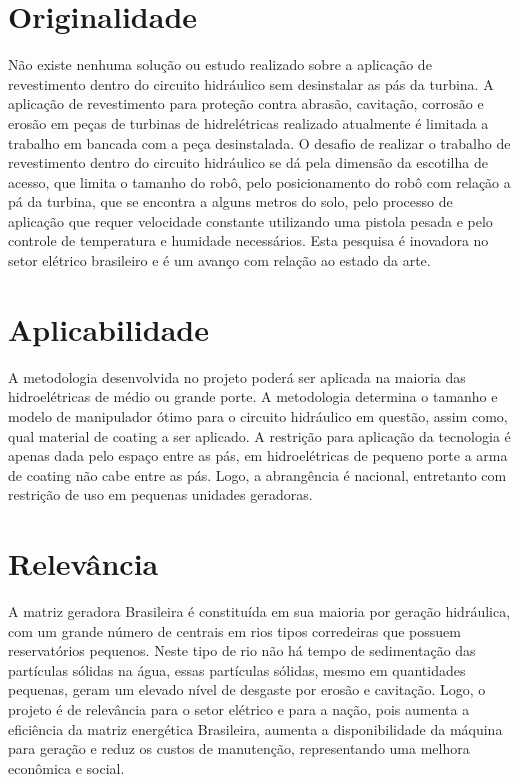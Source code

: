 \section{Originalidade}

Não existe nenhuma solução ou estudo realizado sobre a aplicação de revestimento
dentro do circuito hidráulico sem desinstalar as pás da turbina. A aplicação de
revestimento para proteção contra abrasão, cavitação, corrosão e erosão em peças
de turbinas de hidrelétricas realizado atualmente é limitada a trabalho em
bancada com a peça desinstalada. O desafio de realizar o trabalho de
revestimento dentro do circuito hidráulico se dá pela dimensão da escotilha de
acesso, que limita o tamanho do robô, pelo posicionamento do robô com relação a
pá da turbina, que se encontra a alguns metros do solo, pelo processo de
aplicação que requer velocidade constante utilizando uma pistola pesada e pelo
controle de temperatura e humidade necessários. Esta pesquisa é inovadora no
setor elétrico brasileiro e é um avanço com relação ao estado da arte.

\section{Aplicabilidade}

A metodologia desenvolvida no projeto  poderá ser aplicada na maioria das
hidroelétricas de médio ou grande porte. A metodologia determina o tamanho e
modelo de manipulador ótimo para o circuito hidráulico em questão, assim como,
qual material de coating a ser aplicado. A restrição para aplicação da tecnologia é
apenas dada pelo espaço entre as pás, em hidroelétricas de pequeno porte a arma
de coating não cabe entre as pás. Logo, a abrangência é nacional, entretanto com
restrição de uso em pequenas unidades geradoras.

\section{Relevância}

A matriz geradora Brasileira é constituída em sua maioria por geração
hidráulica, com um grande número de centrais em rios tipos corredeiras que
possuem reservatórios pequenos. Neste tipo de rio não há tempo de sedimentação
das partículas sólidas na água, essas partículas sólidas, mesmo em quantidades
pequenas, geram um elevado nível de desgaste por erosão e cavitação. Logo, o
projeto é de relevância para o setor elétrico e para a nação, pois aumenta a
eficiência da matriz energética Brasileira, aumenta a disponibilidade da máquina
para geração e reduz os custos de manutenção, representando uma melhora
econômica e social.

